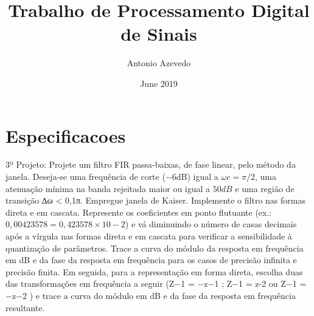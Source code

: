 \documentclass{article}
\title{Trabalho de Processamento Digital de Sinais}
\author{Antonio Azevedo}
\date{June 2019}
\begin{document}
\maketitle

\section{Especificacoes}

3º Projeto: Projete um filtro FIR passa-baixas, de fase linear, pelo método da janela.
Deseja-se uma frequência de corte ($−6$dB) igual a $ωc = π/2$, uma atenuação mínima na banda
rejeitada maior ou igual a $50dB$ e uma região de transição ∆ω < 0,1π. Empregue janela de Kaiser.
Implemente o filtro nas formas direta e em cascata. Represente os coeficientes em ponto flutuante
(ex.: $0,00423578 = 0,423578 × 10−2$) e vá diminuindo o número de casas decimais após a vírgula
nas formas direta e em cascata para verificar a sensibilidade à quantização de parâmetros. Trace a
curva do módulo da resposta em frequência em dB e da fase da resposta em frequência para os
casos de precisão infinita e precisão finita. Em seguida, para a representação em forma direta,
escolha duas das transformações em frequência a seguir (Z−1 = −z−1 ; Z−1 = z-2 ou Z−1 = −z−2 ) e
trace a curva do módulo em dB e da fase da resposta em frequência resultante.
\end{document}

